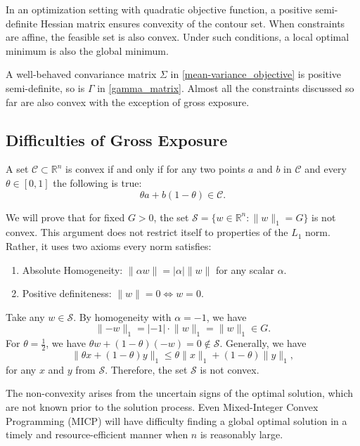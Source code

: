 \documentclass[11pt, letterpaper]{article}
\begin{document}
In an optimization setting with quadratic objective function, a positive semi-definite Hessian matrix ensures convexity of the
contour set. When constraints are affine, the feasible set is also convex. Under such conditions, a local optimal minimum is
also the global minimum.

A well-behaved convariance matrix $\Sigma$ in \eqref{mean-variance_objective} is positive semi-definite, so is $\Gamma$ in
\eqref{gamma_matrix}. Almost all the constraints discussed so far are also convex with the exception of gross exposure.

\subsection{Difficulties of Gross Exposure}
\label{gross_exposure_section}
A set $\mathcal{C} \subset \mathds{R}^n$ is convex if and only if for any two points $a$ and $b$ in $\mathcal{C}$ and every
$\theta \in [0,1]$ the following is true:
\begin{equation}
    \label{convexity_definition}
	\theta a + b (1 - \theta) \in \mathcal{C}.
\end{equation}

We will prove that for fixed $G > 0$, the set $\mathcal{S} = \{w\in \mathds{R}^n:\lVert w\rVert_1 = G\}$ is not convex.
This argument does not restrict itself to properties of the $L_1$ norm. Rather, it uses two axioms every norm satisfies:
\begin{enumerate}
	\item Absolute Homogeneity: $\lVert\alpha w\rVert = |\alpha| \lVert w\rVert$ for any scalar $\alpha$.
	\item Positive definiteness: $\lVert w\rVert = 0 \Leftrightarrow w = 0$.
\end{enumerate}
Take any $w \in \mathcal{S}$. By homogeneity with $\alpha = -1$, we have
\begin{equation*}
	\lVert-w\rVert_1 = | -1|\cdot \lVert w\rVert_1 = \lVert w\rVert_1 \in G.
\end{equation*}
For $\theta = \frac{1}{2}$, we have $\theta w + (1-\theta)(-w) = 0 \notin \mathcal{S}$. Generally, we have
\begin{equation*}
	\lVert \theta x + (1 - \theta)y \rVert_1 \leq \theta\lVert x\rVert_1 + (1-\theta)\lVert y\rVert_1,
\end{equation*}
for any $x$ and $y$ from $\mathcal{S}$. Therefore, the set $\mathcal{S}$ is not convex.

The non-convexity arises from the uncertain signs of the optimal solution, which are not known prior to the solution
process. Even Mixed-Integer Convex Programming (MICP) will have difficulty finding a global optimal solution in a timely and
resource-efficient manner when $n$ is reasonably large.
\end{document}
